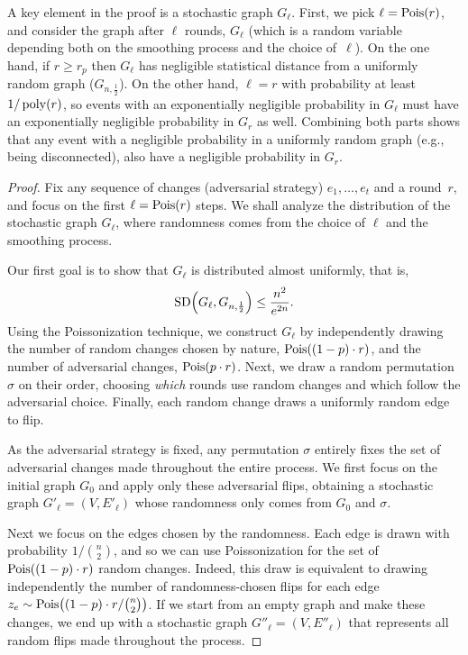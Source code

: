 \documentclass[letter,11pt]{article}
\begin{document}
A key element in the proof is a stochastic graph $G_{\ell}$.
First, we pick $\ell = \poisson{r}$, and consider the graph after $\ell$ rounds, $G_{\ell}$
(which is a random variable depending both on the smoothing process and the choice of~$\ell$).
On the one hand, if $r \geq r_p$ then $G_{\ell}$ has negligible statistical distance from a uniformly random graph ($G_{n,\frac{1}{2}}$).
On the other hand, $\ell = r$ with probability at least $1/\operatorname{poly}(r)$, so events with an exponentially negligible probability in $G_{\ell}$ must have an exponentially negligible probability in $G_r$ as well.
Combining both parts shows that any event with a negligible probability in a uniformly random graph (e.g., being disconnected),
also have a negligible probability in $G_r$.



\begin{proof}
    Fix any sequence of changes (adversarial strategy) $e_1,\dots, e_t$ and a round~$r$, and focus on the first $\ell = \poisson{r}$ steps.
    We shall analyze the distribution of the stochastic graph $G_{\ell}$, where randomness comes from the choice of $\ell$ and the smoothing process.

    Our first goal is to show 
    that $G_\ell$ is distributed almost uniformly, that is, 
    \begin{equation}
        \label{eq:poison_round_is_almost_uniform}
        \sd{G_{\ell}}{G_{n,\frac{1}{2}}} \leq \frac{n^2}{e^{2n}} .
    \end{equation}
    Using the Poissonization technique, we construct $G_{\ell}$ by independently drawing the number of random changes chosen by nature, $\poisson{(1-p)\cdot r}$, and the number of adversarial changes, $\poisson{p\cdot r}$.
    Next, we draw a random permutation $\sigma$ on their order, choosing \emph{which} rounds use random changes and which follow the adversarial choice.
    Finally, each random change draws a uniformly random edge to flip.
    
    As the adversarial strategy is fixed, any permutation $\sigma$ entirely fixes the set of adversarial changes made throughout the entire process.
    We first focus on the initial graph $G_0$ and apply only these adversarial flips, 
    obtaining a stochastic graph $G'_{\ell} = (V,E'_{\ell})$ whose randomness only comes from $G_0$ and $\sigma$. 
    
    Next we focus on the edges chosen by the randomness. Each edge is drawn with probability $1/\binom{n}{2}$, and so we can use Poissonization for the set of $\poisson{(1-p)\cdot r}$ random changes. Indeed, this draw is equivalent to drawing independently the number of randomness-chosen flips for each edge $z_e \sim \poisson{(1-p)\cdot r / \binom{n}{2}}$.
    If we start from an empty graph and make these changes, we end up with a stochastic graph $G''_{\ell} = (V,E''_{\ell})$ that represents all random flips made throughout the process. 


\end{proof}
\end{document}
